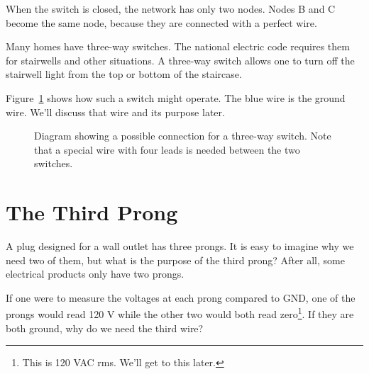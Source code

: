 When the switch is closed, the network has only two nodes. Nodes B and C become the same node, because they are connected with a perfect wire.\par


Many homes have three-way switches. The national electric code requires them for stairwells and other situations. A three-way switch allows one to turn off the stairwell light from the top or bottom of the staircase.
\par
Figure~\ref{F:23W} shows how such a switch might operate. The blue wire is the ground wire. We'll discuss that wire and its purpose later.
\par
\begin{figure}[H]
\begin{center}
\caption{Diagram showing a possible connection for a three-way switch. Note that a special wire with four leads is needed between the two switches.}
\label{F:23W}
\end{center}
\end{figure}


\section{The Third Prong}
A plug designed for a wall outlet has three prongs. It is easy to imagine why we need two of them, but what is the purpose of the third prong? After all, some electrical products only have two prongs.\par

If one were to measure the voltages at each prong compared to GND, one of the prongs would read 120 V while the other two would both read zero\footnote{This is 120 VAC rms. We'll get to this later.}. If they are both ground, why do we need the third wire?\par

